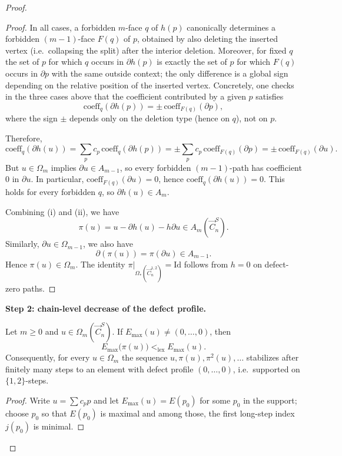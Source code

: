 \documentclass[10pt,a4paper]{amsart}
\begin{document}
\begin{proof}
\begin{proof}
\medskip
In all cases, a forbidden $m$-face $q$ of $h(p)$ canonically determines a forbidden $(m-1)$-face $F(q)$ of $p$,
obtained by also deleting the inserted vertex (i.e.\ collapsing the split) after the interior deletion.
Moreover, for fixed $q$ the set of $p$ for which $q$ occurs in $\partial h(p)$ is exactly the set of $p$ for which
$F(q)$ occurs in $\partial p$ with the same outside context; the only difference is a global sign depending on the
relative position of the inserted vertex.  Concretely, one checks in the three cases above that the coefficient
contributed by a given $p$ satisfies
\[
\mathrm{coeff}_q(\partial h(p))=\pm\,\mathrm{coeff}_{F(q)}(\partial p),
\]
where the sign $\pm$ depends only on the deletion type (hence on $q$), not on $p$.

Therefore,
\[
\mathrm{coeff}_q(\partial h(u))
=\sum_{p} c_p\,\mathrm{coeff}_q(\partial h(p))
=\pm\sum_{p} c_p\,\mathrm{coeff}_{F(q)}(\partial p)
=\pm\,\mathrm{coeff}_{F(q)}(\partial u).
\]
But $u\in\Omega_m$ implies $\partial u\in A_{m-1}$, so every forbidden $(m-1)$-path has coefficient $0$ in $\partial u$.
In particular, $\mathrm{coeff}_{F(q)}(\partial u)=0$, hence $\mathrm{coeff}_q(\partial h(u))=0$.
This holds for every forbidden $q$, so $\partial h(u)\in A_m$.

\medskip
Combining (i) and (ii), we have
\[
\pi(u)=u-\partial h(u)-h\partial u\in A_m(\vec{C}_n^S).
\]
Similarly, $\partial u\in\Omega_{m-1}$, we also have
\[\partial(\pi(u))=\pi(\partial u)\in A_{m-1}.\] 
Hence $\pi(u)\in\Omega_m$.
The identity $\pi|_{\Omega_*(\vec{C}_n^{1,2})}=\mathrm{Id}$ follows from $h=0$ on defect-zero paths.
\end{proof}

\noindent\textbf{Step 2: chain-level decrease of the defect profile.}

\begin{lemma}
Let $m\ge 0$ and $u\in\Omega_m(\vec{C}_n^S)$.  If $E_{\max}(u)\neq (0,\dots,0)$, then
\[
E_{\max}\bigl(\pi(u)\bigr) <_{\mathrm{lex}} E_{\max}(u).
\]
Consequently, for every $u\in\Omega_m$ the sequence $u,\pi(u),\pi^2(u),\dots$ stabilizes after finitely many steps
to an element with defect profile $(0,\dots,0)$, i.e.\ supported on $\{1,2\}$-steps.
\end{lemma}

\begin{proof}
Write $u=\sum c_p p$ and let $E_{\max}(u)=E(p_0)$ for some $p_0$ in the support; choose $p_0$ so that
$E(p_0)$ is maximal and among those, the first long-step index $j(p_0)$ is minimal.


\end{proof}
\end{proof}
\end{document}
